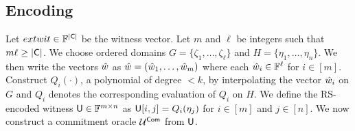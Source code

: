 \subsection{Encoding}\label{subsec:encode2D} 
Let $extwit \in \mathbb{F}^{|\mathsf{C}|}$ be the witness vector. Let $m$ and $\ell$ be integers such that $m\ell\geq \mathsf{|C|}$. We choose ordered domains $G=\{\zeta_1,\ldots,\zeta_\ell\}$ and $H=\{\eta_1,\ldots,\eta_n\}$. We then write the vectors $\hat{w}$ as $\hat{w} = (\hat{w}_{1},\ldots,\hat{w}_{m})$ where each $\hat{w}_{i}\in \mathbb{F}^\ell$ for $i \in [m]$. Construct $Q_i(\cdot)$, a polynomial of degree $<k$, by interpolating the vector $\hat{w}_{i}$ on $G$ and $Q_{i}$ denotes the corresponding evaluation of $Q_{i}$ on $H$. We define the RS-encoded witness $\mathsf{U}\in \mathbb{F}^{m\times n}$ as $\mathsf{U}[i,j]=Q_{i}(\eta_j)$ for $ i\in [m]$ and $j\in [n]$. We now construct a commitment oracle $\mathcal{U}^{\mathsf{Com}}$ from $\mathsf{U}$.
%
%
 
